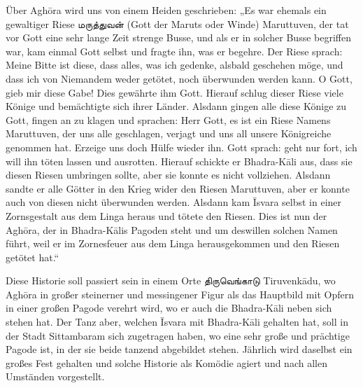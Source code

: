\documentclass{article}
\newcommand{\TamilText}[1]{\texttamil{#1}}
\newcommand{\tam}[1]{\TamilText{#1}}
\begin{document}
Über Agh\={o}ra wird uns von einem Heiden geschrieben: „Es war ehemals ein gewaltiger Riese \tam{மருத்துவன்} (Gott der Maruts oder Winde) Maruttuven, der tat vor Gott eine sehr lange Zeit strenge Busse, und als er in solcher Busse begriffen war, kam einmal Gott selbst und fragte ihn, was er begehre. Der Riese sprach: Meine Bitte ist diese, dass alles, was ich gedenke, alsbald geschehen möge, und dass ich von Niemandem weder getötet, noch überwunden werden kann. O Gott, gieb mir diese Gabe! Dies gewährte ihm Gott. Hierauf schlug dieser Riese viele Könige und bemächtigte sich ihrer Länder. Alsdann gingen alle diese Könige zu Gott, fingen an zu klagen und sprachen: Herr Gott, es ist ein Riese Namens Maruttuven, der uns alle geschlagen, verjagt und uns all unsere Königreiche genommen hat. Erzeige uns doch Hülfe wieder ihn. Gott sprach: geht nur fort, ich will ihn töten lassen und ausrotten. Hierauf schickte er Bhadra-K\={a}li aus, dass sie diesen Riesen umbringen sollte, aber sie konnte es nicht vollziehen. Alsdann sandte er alle Götter in den Krieg wider den Riesen Maruttuven, aber er konnte auch von diesen nicht überwunden werden. Alsdann kam \={I}svara selbst in einer Zornsgestalt aus dem Linga heraus und tötete den Riesen. Dies ist nun der Agh\={o}ra, der in Bhadra-K\={a}lis Pagoden steht und um deswillen solchen Namen führt, weil er im Zornesfeuer aus dem Linga herausgekommen und den Riesen getötet hat.“

Diese Historie soll passiert sein in einem Orte \tam{திருவெங்காடு} Tiruvenk\={a}du, wo Agh\={o}ra in großer steinerner und messingener Figur als das Hauptbild mit Opfern in einer großen Pagode verehrt wird, wo er auch die Bhadra-K\={a}li neben sich stehen hat. Der Tanz aber, welchen \={I}svara mit Bhadra-K\={a}li gehalten hat, soll in der Stadt Sittambaram sich zugetragen haben, wo eine sehr große und prächtige Pagode ist, in der sie beide tanzend abgebildet stehen. Jährlich wird daselbst ein großes Fest gehalten und solche Historie als Komödie agiert und nach allen Umständen vorgestellt.
\end{document}
